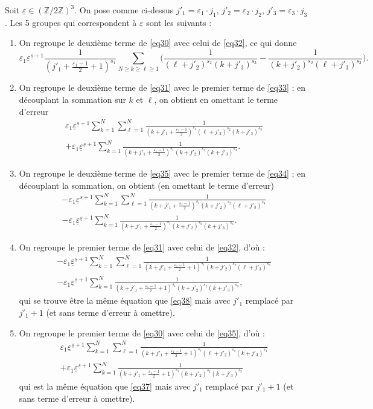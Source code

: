 \documentclass[12pt,francais, reqno]{smfart}
\numberwithin{equation}{section}
\newcommand{\Z}{\mathbb Z}
\newcommand{\zdzt}{(\Z / 2 \Z)^3}
\newcommand{\eps}{\varepsilon}
\newcommand{\epssoul}{\underline{\eps}}
\newcommand{\ssoul}{\underline{s}}
\newcommand{\jprun}{j'_1+\frac{\eps_1-1}{2}}
\begin{document}
Soit $\epssoul \in \zdzt$. On pose comme ci-dessus $j'_1 = \eps_1 \cdot j_1$, $j'_2 = \eps_2 \cdot j_2$,  $j'_3 = \eps_3 \cdot j_3$.  Les 5 groupes qui correspondent \`a $\epssoul$ sont les suivants :
\begin{enumerate}
\item On regroupe le deuxi\`eme terme de \eqref{eq30} avec celui de \eqref{eq32}, ce qui donne
\begin{equation} \label{eq36}
\eps_1 \epssoul^{\ssoul+1}  \frac{1}{(\jprun +1)^{s_1}}  \sum_{N \geq k \geq \ell  \geq 1} \Big( \frac{1}{(\ell+j'_2)^{s_2}(k+j'_3)^{s_3}} - \frac{1}{(k+j'_2)^{s_2}(\ell+j'_3)^{s_3}} \Big).
\end{equation} 
\item On regroupe   le deuxi\`eme terme de \eqref{eq31} avec le premier terme  de \eqref{eq33} ; en 
d\'ecouplant la sommation sur $k$ et $\ell$, on obtient en omettant le terme d'erreur 
\begin{multline}
\eps_1 \epssoul^{\ssoul+1} 
  \sum_{ k=1} ^N   \sum_{ \ell=1} ^N  \frac{1}{(k+\jprun)^{s_1}(\ell+j'_2)^{s_2}(k+j'_3)^{s_3}}  
\\
+ \eps_1 \epssoul^{\ssoul+1} 
  \sum_{ k=1} ^N  \frac{1}{(k+\jprun)^{s_1}(k+j'_2)^{s_2}(k+j'_3)^{s_3}}.  \label{eq37}
\end{multline} 
\item On regroupe   le deuxi\`eme terme de \eqref{eq35} avec le premier terme  
de \eqref{eq34} ; en d\'ecouplant la sommation, on obtient (en omettant le terme d'erreur)
\begin{multline}
-\eps_1 \epssoul^{\ssoul+1} 
  \sum_{ k=1} ^N   \sum_{ \ell=1} ^N  \frac{1}{(k+\jprun)^{s_1}(k+j'_2)^{s_2}(\ell+j'_3)^{s_3}}  \label{eq38}\\
- \eps_1 \epssoul^{\ssoul+1} 
  \sum_{ k=1} ^N  \frac{1}{(k+\jprun)^{s_1}(k+j'_2)^{s_2}(k+j'_3)^{s_3}}.
\end{multline} 
\item On regroupe   le premier  terme de \eqref{eq31} avec celui de \eqref{eq32}, d'o\`u :
\begin{multline} 
-\eps_1 \epssoul^{\ssoul+1} 
  \sum_{ k=1} ^N   \sum_{ \ell=1} ^N  \frac{1}{(k+\jprun+1)^{s_1}(k+j'_2)^{s_2}(\ell+j'_3)^{s_3}} \label{eq39} \\
- \eps_1 \epssoul^{\ssoul+1} 
  \sum_{ k=1} ^N  \frac{1}{(k+\jprun+1)^{s_1}(k+j'_2)^{s_2}(k+j'_3)^{s_3}}, 
\end{multline} 
qui se trouve \^etre la m\^eme \'equation que \eqref{eq38} mais avec $j'_1$ remplac\'e par $j'_1+1$ (et sans terme d'erreur \`a omettre).
\item On regroupe   le premier  terme de \eqref{eq30} avec celui de \eqref{eq35}, d'o\`u :
\begin{multline}
\eps_1 \epssoul^{\ssoul+1} 
  \sum_{ k=1} ^N   \sum_{ \ell=1} ^N  \frac{1}{(k+\jprun+1)^{s_1}(\ell+j'_2)^{s_2}(k+j'_3)^{s_3}}  \label{eq40}\\
+ \eps_1 \epssoul^{\ssoul+1}
  \sum_{ k=1} ^N  \frac{1}{(k+\jprun+1)^{s_1}(k+j'_2)^{s_2}(k+j'_3)^{s_3}} 
\end{multline} 
qui est la m\^eme \'equation que \eqref{eq37} mais avec $j'_1$ remplac\'e par $j'_1+1$ (et sans terme d'erreur \`a omettre).
\end{enumerate} 
\end{document}
